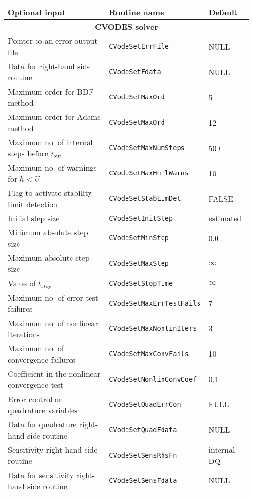 %
%
\begin{acmtable}{\textwidth}
\centering
\begin{tabularx}{\textwidth}{lll}
{\bf Optional input} & {\bf Routine name} & {\bf Default} \\
\hline
\multicolumn{3}{c}{\bf CVODES solver} \\
\hline
Pointer to an error output file & {\tt CVodeSetErrFile} & NULL  \\
Data for right-hand side routine & {\tt CVodeSetFdata} & NULL \\
Maximum order for BDF method & {\tt CVodeSetMaxOrd} & 5 \\
Maximum order for Adams method & {\tt CVodeSetMaxOrd} & 12  \\
Maximum no. of internal steps before $t_{\mbox{\scriptsize out}}$ & {\tt CVodeSetMaxNumSteps} & 500 \\
Maximum no. of warnings for $h < U$ & {\tt CVodeSetMaxHnilWarns} & 10 \\
Flag to activate stability limit detection & {\tt CVodeSetStabLimDet} & FALSE \\
Initial step size & {\tt CVodeSetInitStep} & estimated \\
Minimum absolute step size & {\tt CVodeSetMinStep} & 0.0 \\
Maximum absolute step size & {\tt CVodeSetMaxStep} & $\infty$ \\
Value of $t_{stop}$ & {\tt CVodeSetStopTime} & $\infty$ \\
Maximum no. of error test failures & {\tt CVodeSetMaxErrTestFails} & 7 \\
Maximum no. of nonlinear iterations & {\tt CVodeSetMaxNonlinIters} & 3 \\
Maximum no. of convergence failures & {\tt CVodeSetMaxConvFails} & 10 \\
Coefficient in the nonlinear convergence test & {\tt CVodeSetNonlinConvCoef} & 0.1 \\
Error control on quadrature variables & {\tt CVodeSetQuadErrCon} & FULL \\
Data for quadrature right-hand side routine & {\tt CVodeSetQuadFdata} & NULL\\
Sensitivity right-hand side routine & {\tt CVodeSetSensRhsFn}  & internal DQ  \\
Data for sensitivity right-hand side routine & {\tt CVodeSetSensFdata} & NULL \\

\end{tabularx}
\end{acmtable}
